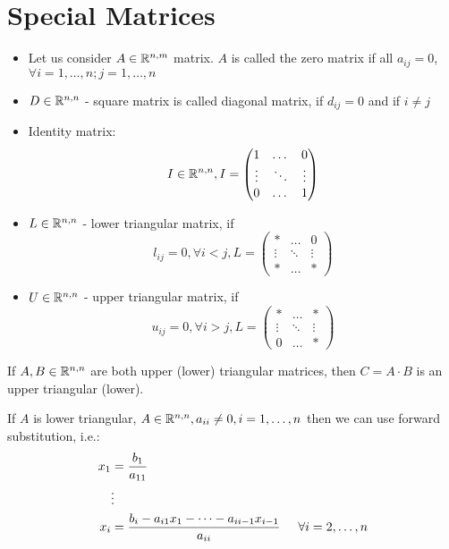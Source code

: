 \section{Special Matrices}
\begin{itemize}
\item Let us consider $A\in\mathbb{R}^{n,m}$ matrix. $A$ is called the zero matrix if all $a_{ij} = 0$, $\forall i=1,\dots,n;j=1,\dots,n$
\item $D\in\mathbb{R}^{n,n}$ - square matrix is called diagonal matrix, if $d_{ij} = 0$ and if $i\not=j$
\item Identity matrix: 
\[I\in\mathbb{R}^{n,n}, I=\begin{pmatrix}
1 & \dots & 0\\
\vdots & \ddots & \vdots\\
0 & \dots & 1
\end{pmatrix}
\]
\item $L\in\mathbb{R}^{n,n}$ - lower triangular matrix, if 
\[
l_{ij}=0, \forall i<j, L = \begin{pmatrix}
* & \dots & 0\\
\vdots & \ddots & \vdots\\
* & \dots & *
\end{pmatrix}
\]
\item $U\in\mathbb{R}^{n,n}$ - upper triangular matrix, if 
\[
u_{ij}=0, \forall i>j, L = \begin{pmatrix}
* & \dots & *\\
\vdots & \ddots & \vdots\\
0 & \dots & *
\end{pmatrix}
\]
\end{itemize}
\begin{remark}
If $A,B\in\mathbb{R}^{n,n}$ are both upper (lower) triangular matrices, then $C=A\cdot B$ is an upper triangular (lower).\\
\end{remark}

If $A$ is lower triangular, $A\in\mathbb{R}^{n,n}, a_{ii}\not = 0,i=1,\dots,n$ then we can use forward substitution, i.e.:
\begin{align*}
x_1 &= \frac{b_1}{a_{11}}	\\
&\vdots\\
x_i &= \frac{b_i-a_{i1}x_1-\dots-a_{ii-1}x_{i-1}}{a_{ii}}\hspace{5mm} \forall i = 2,\dots,n
\end{align*}
